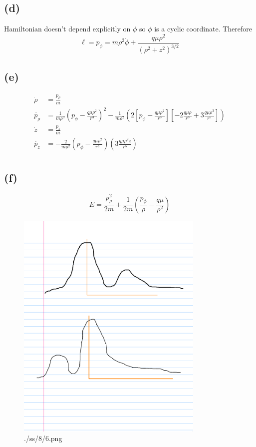 \documentclass[letter, 10pts]{article}
\begin{document}
\subsection*{(d)}
Hamiltonian doesn't depend explicitly on $\phi$ so $\phi$ is a cyclic coordinate. Therefore
\[
\ell = p_\phi = m \rho^2 \dot{\phi} + \frac{q \mu \rho^2}{(\rho^2 + z^2)^{3 / 2}}
\] 


\subsection*{(e)} 
\begin{align*}
	\dot{\rho} &= \frac{p_\rho}{m} \\ 
	\dot{p_\rho} &= \frac{1}{m \rho^3} 
	\left( p_\phi - \frac{q \mu \rho^2}{r^3}\right)^2 
	- 
	\frac{1}{m \rho^2}
	\left(
2 
\left[
p_\phi - \frac{q \mu \rho^2}{r^3}  
\right]
\left[
- 2 \frac{q \mu \rho}{r^3} 
+
3 \frac{q \mu \rho^3}{r^{5}}
\right]
	\right)\\
	\dot{z} &= \frac{p_z}{m} \\
	\dot{p_z} &= - \frac{2}{m \rho^2} \left(p_\phi - \frac{q \mu \rho^2}{r^3} \right)
	\left(3 \frac{q \mu \rho^2 z}{r^{5}}\right)\\
\end{align*}


\subsection*{(f)}
\[
\boxed{
E = \frac{p_\rho ^2}{2m} + \frac{1}{2m} \left(
\frac{p_\phi}{\rho} - \frac{q \mu }{\rho^2}
\right)
}
\] 
\begin{figure}[H]
	\centering
	\includegraphics[width=0.8\textwidth]{./ss/8/6.png}
	\caption{./ss/8/6.png}
	\label{fig:-ss-8-6-png}
\end{figure}
\end{document}

